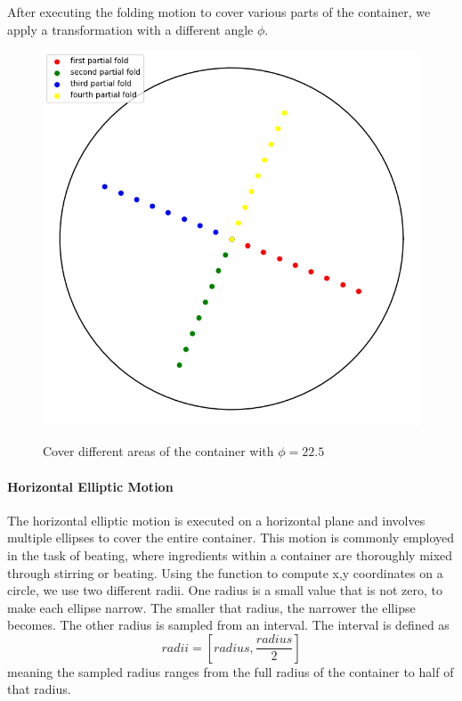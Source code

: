 After executing the folding motion to cover various parts of the container, we apply a transformation with a different angle $\phi$.

\begin{figure}[H]
    \includegraphics[scale=0.35]{Graphics/motions/folding1.png}
    \centering
    \label{fig:foldingMotion1}
    \caption{Cover different areas of the container with $\phi=22.5$}
\end{figure}

\paragraph{Horizontal Elliptic Motion}
The horizontal elliptic motion is executed on a horizontal plane and involves multiple ellipses to cover the entire container.
This motion is commonly employed in the task of beating, where ingredients within a container are thoroughly mixed through stirring or beating.
\newline
\newline
Using the function to compute x,y coordinates on a circle, we use two different radii.
One radius is a small value that is not zero, to make each ellipse narrow. The smaller that radius, the narrower the ellipse becomes. The other radius is sampled from an interval. 
The interval is defined as \[radii = [radius, \frac{radius} {2} ]\]
meaning the sampled radius ranges from the full radius of the container to half of that radius.

